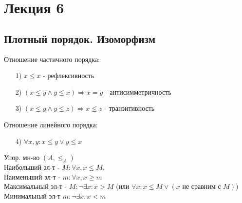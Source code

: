 \section{Лекция 6}
\subsection{Плотный порядок. Изоморфизм}
Отношение частичного порядка:
\begin{itemize}
  \item [1) ] $x \leq x$ - рефлексивность
  \item [2) ] $(x \leq y \land y \leq x) \Rightarrow x = y$ - антисимметричность
  \item [3) ] $(x \leq y \land y \leq z) \Rightarrow x \leq z$ - транзитивность
\end{itemize}
Отношение линейного порядка:
\begin{itemize}
  \item [4) ] $\forall x, y \colon x \leq y \lor y \leq x$
\end{itemize}
Упор. мн-во $(A, \leq_A)$ \\
Наибольший эл-т - $M \colon \forall x, x \leq M$. \\
Наименьший эл-т - $m \colon \forall x, x \geq m$ \\
Максимальный эл-т - $M \colon \neg \exists x \colon x > M$ (или $\forall x \colon x \leq M \lor (x \text{ не сравним с } M)$) \\
Минимальный эл-т $m \colon \neg \exists x \colon x < m$

